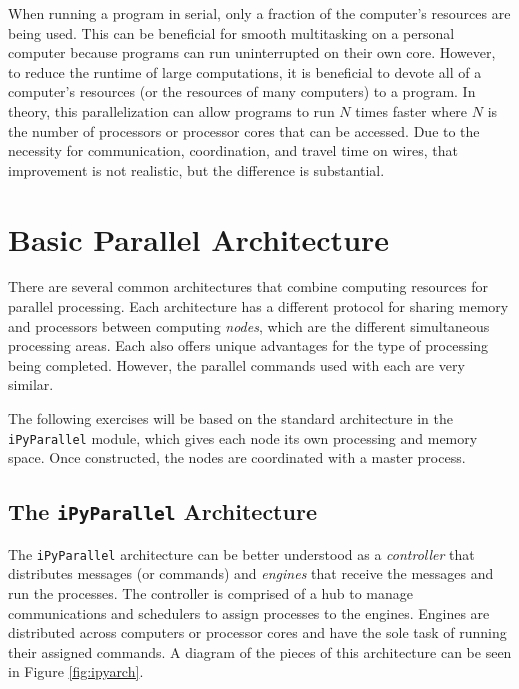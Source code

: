 
When running a program in serial, only a fraction of the computer's resources are being used.
This can be beneficial for smooth multitasking on a personal computer because programs can run uninterrupted on their own core.
However, to reduce the runtime of large computations, it is beneficial to devote all of a computer's resources (or the resources of many computers) to a program.
In theory, this parallelization can allow programs to run $N$ times faster where $N$ is the number of processors or processor cores that can be accessed.
Due to the necessity for communication, coordination, and travel time on wires, that improvement is not realistic, but the difference is substantial.

\section*{Basic Parallel Architecture}
There are several common architectures that combine computing resources for parallel processing.
Each architecture has a different protocol for sharing memory and processors between computing \emph{nodes}, which are the different simultaneous processing areas.
Each also offers unique advantages for the type of processing being completed.
However, the parallel commands used with each are very similar.

The following exercises will be based on the standard architecture in the \texttt{iPyParallel} module, which gives each node its own processing and memory space.
Once constructed, the nodes are coordinated with a master process.

\subsection*{The \texttt{iPyParallel} Architecture}
The \texttt{iPyParallel} architecture can be better understood as a \emph{controller} that distributes messages (or commands) and \emph{engines} that receive the messages and run the processes.
The controller is comprised of a hub to manage communications and schedulers to assign processes to the engines.
Engines are distributed across computers or processor cores and have the sole task of running their assigned commands.
A diagram of the pieces of this architecture can be seen in Figure \ref{fig:ipyarch}.

